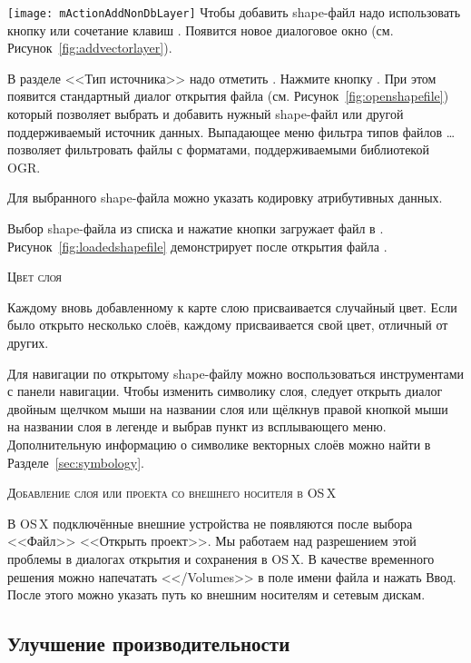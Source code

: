 \texttt{[image: mActionAddNonDbLayer]} Чтобы добавить shape-файл
надо использовать кнопку 
 или сочетание клавиш .
Появится новое диалоговое окно (см. Рисунок~\ref{fig:addvectorlayer}).

В разделе <<Тип источника>> надо отметить . Нажмите
кнопку . При этом появится стандартный диалог открытия файла
(см. Рисунок~\ref{fig:openshapefile}) который позволяет выбрать и добавить
нужный shape-файл или другой поддерживаемый источник данных. Выпадающее меню
фильтра типов файлов \ldots позволяет фильтровать
файлы с форматами, поддерживаемыми библиотекой OGR.

Для выбранного shape-файла можно указать кодировку атрибутивных данных.

Выбор shape-файла из списка и нажатие кнопки  загружает
файл в \qg. Рисунок~\ref{fig:loadedshapefile} демонстрирует \qg после
открытия файла .


\begin{Tip}\caption{\textsc{Цвет слоя}}
Каждому вновь добавленному к карте слою присваивается случайный цвет.
Если было открыто несколько слоёв, каждому присваивается свой цвет,
отличный от других.
\end{Tip}

Для навигации по открытому shape-файлу можно воспользоваться инструментами
с панели навигации. Чтобы изменить символику слоя, следует открыть диалог
 двойным щелчком мыши на названии слоя или щёлкнув
правой кнопкой мыши на названии слоя в легенде и выбрав пункт
 из всплывающего меню. Дополнительную информацию
о символике векторных слоёв можно найти в Разделе~\ref{sec:symbology}.

\begin{Tip}\caption{\textsc{Добавление слоя или проекта со внешнего носителя в OS\,X}}
В OS\,X подключённые внешние устройства не появляются после выбора <<Файл>> \arrow
<<Открыть проект>>. Мы работаем над разрешением этой проблемы в диалогах
открытия и сохранения в OS\,X. В качестве временного решения можно напечатать
<</Volumes>> в поле имени файла и нажать Ввод. После этого можно указать путь
ко внешним носителям и сетевым дискам.
\end{Tip}

\subsection{Улучшение производительности}

